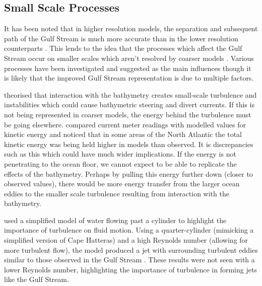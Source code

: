 \documentclass[..\EOYR.tex]{subfiles}
\begin{document}

\subsection{Small Scale Processes}
\label{SSEC:SmallScaleProcesses}

It has been noted that in higher resolution models, the separation and subsequent path of the Gulf Stream is much more accurate than in the lower resolution counterparts \citep{Hurlburt2008}\citep{Zhang2007}. This lends to the idea that the processes which affect the Gulf Stream occur on smaller scales which aren't resolved by coarser models \citep{NaveiraGarabato2013}\citep{Nikurashin2012a}. Various processes have been investigated and suggested as the main influences though it is likely that the improved Gulf Stream representation is due to multiple factors.


\citep{NaveiraGarabato2013} theorised that interaction with the bathymetry creates small-scale turbulence and instabilities which could cause bathymetric steering and divert currents. If this is not being represented in coarser models, the energy behind the turbulence must be going elsewhere. \citep{Scott2010} compared current meter readings with modelled values for kinetic energy and noticed that in some areas of the North Atlantic the total kinetic energy was being held higher in models than observed. It is discrepancies such as this which could have much wider implications. If the energy is not penetrating to the ocean floor, we cannot expect to be able to replicate the effects of the bathymetry. Perhaps by pulling this energy further down (closer to observed values), there would be more energy transfer from the larger ocean eddies to the smaller scale turbulence resulting from interaction with the bathymetry.

\citep{Tansley2001} used a simplified model of water flowing past a cylinder to highlight the importance of turbulence on fluid motion. 
Using a quarter-cylinder (mimicking a simplified version of Cape Hatteras) and a high Reynolds number (allowing for more turbulent flow), the model produced a jet with surrounding turbulent eddies similar to those observed in the Gulf Stream
. These results were not seen with a lower Reynolds number, highlighting the importance of turbulence in forming jets like the Gulf Stream.
\end{document}
